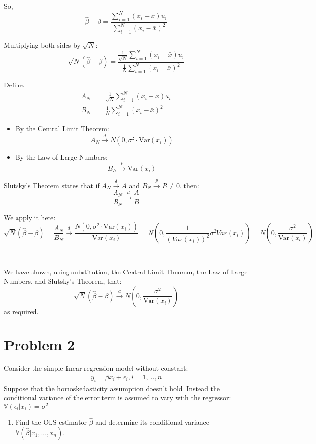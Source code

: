 \documentclass{article}
\begin{document}
\begin{flushleft}
So,
\[
\hat{\beta} - \beta = \frac{\sum_{i=1}^N (x_i - \bar{x}) u_i}{\sum_{i=1}^N (x_i - \bar{x})^2}
\]

Multiplying both sides by $\sqrt{N}$:
\[
\sqrt{N}(\hat{\beta} - \beta) = \frac{\frac{1}{\sqrt{N}} \sum_{i=1}^N (x_i - \bar{x}) u_i}{\frac{1}{N} \sum_{i=1}^N (x_i - \bar{x})^2}
\]

Define:
\begin{align*}
A_N &= \frac{1}{\sqrt{N}} \sum_{i=1}^N (x_i - \bar{x}) u_i \\
B_N &= \frac{1}{N} \sum_{i=1}^N (x_i - \bar{x})^2
\end{align*}

\begin{itemize}
\item By the Central Limit Theorem:
\[
A_N \overset{d}{\longrightarrow} N\left(0, \sigma^2 \cdot \text{Var}(x_i) \right)
\]

\item By the Law of Large Numbers:
\[
B_N \overset{p}{\longrightarrow} \text{Var}(x_i)
\]
\end{itemize}


Slutsky’s Theorem states that if $A_N \overset{d}{\rightarrow} A$ and $B_N \overset{p}{\rightarrow} B \neq 0$, then:
\[
\frac{A_N}{B_N} \overset{d}{\longrightarrow} \frac{A}{B}
\]

We apply it here:
\[
\sqrt{N}(\hat{\beta} - \beta) = \frac{A_N}{B_N}
\overset{d}{\longrightarrow}
\frac{N\left(0, \sigma^2 \cdot \text{Var}(x_i)\right)}{\text{Var}(x_i)} = N\left(0, \frac{1}{(Var(x_i))^2}\sigma^2Var(x_i)\right)= N\left(0, \frac{\sigma^2}{\text{Var}(x_i)}\right)
\]

\

We have shown, using substitution, the Central Limit Theorem, the Law of Large Numbers, and Slutsky’s Theorem, that:
\[
\sqrt{N}(\hat{\beta} - \beta) \overset{d}{\longrightarrow} N\left(0, \frac{\sigma^2}{\text{Var}(x_i)}\right)
\]
as required.
\section*{Problem 2}
Consider the simple linear regression model without constant:
\begin{align*}
    y_i=\beta x_i + \epsilon_i, i=1,...,n
\end{align*}
Suppose that the homoskedasticity assumption doesn't hold. Instead the conditional variance of the error term is assumed to vary with the regressor: $\mathbb{V}(\epsilon_i|x_i)=\sigma^2$
\begin{enumerate}
    \item Find the OLS estimator $\hat{\beta}$ and determine its conditional variance $\mathbb{V}(\hat{\beta}|x_1,...,x_n)$.\\~\\



\end{enumerate}
\end{flushleft}
\end{document}
